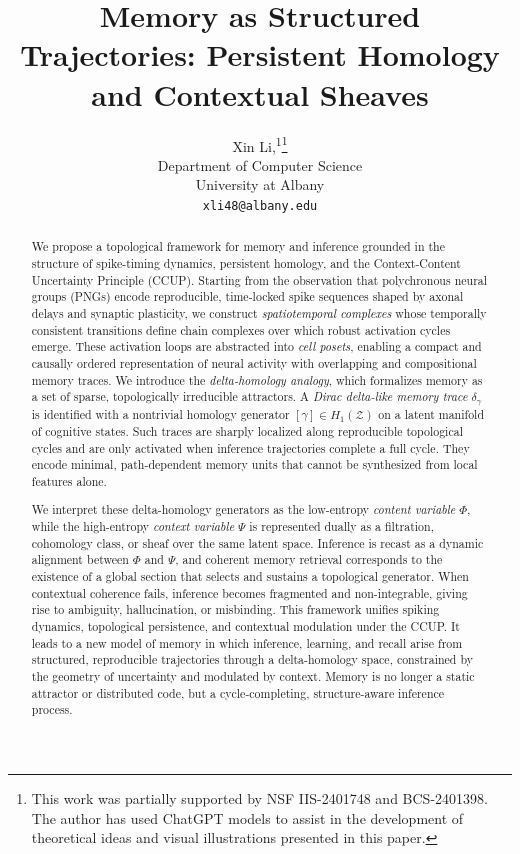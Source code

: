 \documentclass[lettersize,journal]{IEEEtran}
\title{Memory as Structured Trajectories: Persistent Homology and Contextual Sheaves}
\author{%
  Xin Li,\textsuperscript{1}\thanks{This work was partially supported by NSF IIS-2401748 and BCS-2401398. The author has used ChatGPT models to assist in the development of theoretical ideas and visual illustrations presented in this paper.} \\
  Department of Computer Science\\
  University at Albany\\
  \texttt{xli48@albany.edu}
}
\begin{document}
\maketitle

\begin{abstract}
We propose a topological framework for memory and inference grounded in the structure of spike-timing dynamics, persistent homology, and the Context-Content Uncertainty Principle (CCUP). Starting from the observation that polychronous neural groups (PNGs) encode reproducible, time-locked spike sequences shaped by axonal delays and synaptic plasticity, we construct \emph{spatiotemporal complexes} whose temporally consistent transitions define chain complexes over which robust activation cycles emerge. These activation loops are abstracted into \emph{cell posets}, enabling a compact and causally ordered representation of neural activity with overlapping and compositional memory traces.
We introduce the \emph{delta-homology analogy}, which formalizes memory as a set of sparse, topologically irreducible attractors. A \emph{Dirac delta-like memory trace} \( \delta_\gamma \) is identified with a nontrivial homology generator \( [\gamma] \in H_1(\mathcal{Z}) \) on a latent manifold of cognitive states. Such traces are sharply localized along reproducible topological cycles and are only activated when inference trajectories complete a full cycle. They encode minimal, path-dependent memory units that cannot be synthesized from local features alone.

We interpret these delta-homology generators as the low-entropy \emph{content variable} \( \Phi \), while the high-entropy \emph{context variable} \( \Psi \) is represented dually as a filtration, cohomology class, or sheaf over the same latent space. Inference is recast as a dynamic alignment between \( \Phi \) and \( \Psi \), and coherent memory retrieval corresponds to the existence of a global section that selects and sustains a topological generator. When contextual coherence fails, inference becomes fragmented and non-integrable, giving rise to ambiguity, hallucination, or misbinding.
This framework unifies spiking dynamics, topological persistence, and contextual modulation under the CCUP. It leads to a new model of memory in which inference, learning, and recall arise from structured, reproducible trajectories through a delta-homology space, constrained by the geometry of uncertainty and modulated by context. Memory is no longer a static attractor or distributed code, but a cycle-completing, structure-aware inference process.
\end{abstract}
\end{document}
